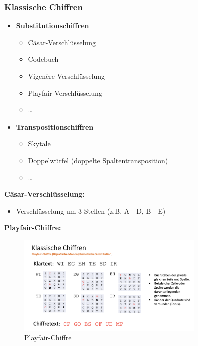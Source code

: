 \documentclass[a4paper,12pt]{article}
\begin{document}
\subsubsection{Klassische Chiffren}
\begin{itemize}
    \item \textbf{Substitutionschiffren}
    \begin{itemize}
        \item Cäsar-Verschlüsselung
        \item Codebuch
        \item Vigenère-Verschlüsselung
        \item Playfair-Verschlüsselung
        \item \dots
    \end{itemize}
    \item \textbf{Transpositionschiffren}
    \begin{itemize}
        \item Skytale
        \item Doppelwürfel (doppelte Spaltentransposition)
        \item \dots
    \end{itemize}
\end{itemize}

\vspace{1em}
\noindent\textbf{Cäsar-Verschlüsselung:}
\begin{itemize}
    \item Verschlüsselung um 3 Stellen (z.B. A - D, B - E)
\end{itemize}

\vspace{1em}
\noindent\textbf{Playfair-Chiffre:}
\begin{figure}[H]
    \centering
    \includegraphics[width=0.8\textwidth]{bilder/playfair.png}
    \caption{Playfair-Chiffre}
    \label{fig:playfair}
\end{figure}
\end{document}
